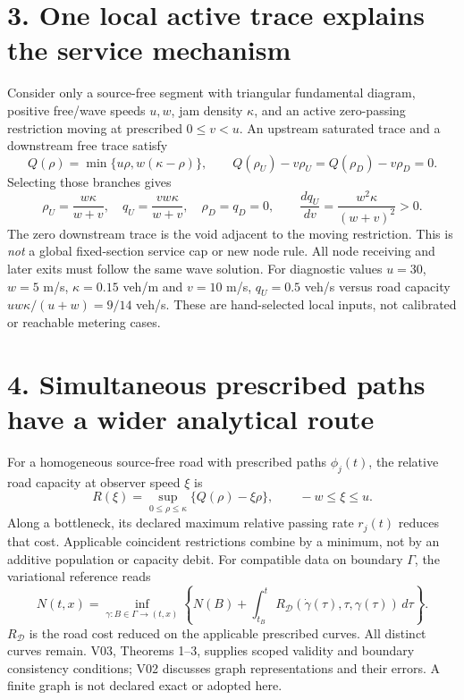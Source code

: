 \documentclass[11pt,a4paper]{article}
\begin{document}
\section*{3. One local active trace explains the service mechanism}
Consider only a source-free segment with triangular fundamental diagram,
positive free/wave speeds $u,w$, jam density $\kappa$, and an active zero-passing
restriction moving at prescribed $0\le v<u$. An upstream saturated trace and a
downstream free trace satisfy
\begin{equation}
 Q(\rho)=\min\{u\rho,w(\kappa-\rho)\},\qquad
 Q(\rho_U)-v\rho_U=Q(\rho_D)-v\rho_D=0.
\end{equation}
Selecting those branches gives
\begin{equation}
 \rho_U=\frac{w\kappa}{w+v},\quad
 q_U=\frac{vw\kappa}{w+v},\quad
 \rho_D=q_D=0,\qquad
 \frac{dq_U}{dv}=\frac{w^2\kappa}{(w+v)^2}>0.
\end{equation}
The zero downstream trace is the void adjacent to the moving restriction.
This is \emph{not} a global fixed-section service cap or new node rule.
All node receiving and later exits must follow the same wave solution.
For diagnostic values $u=30$, $w=5$ m/s, $\kappa=0.15$ veh/m and $v=10$ m/s,
$q_U=0.5$ veh/s versus road capacity $uw\kappa/(u+w)=9/14$ veh/s.
These are hand-selected local inputs, not calibrated or reachable metering cases.

\newpage
\section*{4. Simultaneous prescribed paths have a wider analytical route}
For a homogeneous source-free road with prescribed paths $\phi_j(t)$,
the relative road capacity at observer speed $\xi$ is
\begin{equation}
 R(\xi)=\sup_{0\le\rho\le\kappa}\{Q(\rho)-\xi\rho\},\qquad -w\le\xi\le u.
\end{equation}
Along a bottleneck, its declared maximum relative passing rate $r_j(t)$ reduces
that cost. Applicable coincident restrictions combine by a minimum, not by an
additive population or capacity debit. For compatible data on boundary $\Gamma$,
the variational reference reads
\begin{equation}
 N(t,x)=\inf_{\gamma:B\in\Gamma\to(t,x)}
 \left\{N(B)+\int_{t_B}^{t}R_{\mathcal D}
       (\dot\gamma(\tau),\tau,\gamma(\tau))\,d\tau\right\}.
\end{equation}
$R_{\mathcal D}$ is the road cost reduced on the applicable prescribed curves.
All distinct curves remain. V03, Theorems 1--3, supplies scoped validity and
boundary consistency conditions; V02 discusses graph representations and their
errors. A finite graph is not declared exact or adopted here.
\end{document}
